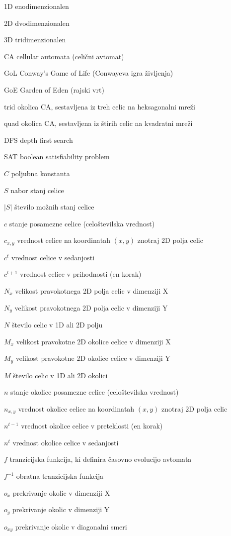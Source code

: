 \documentclass[12pt,a4paper,openany,twoside]{book}
\newcommand{\abbrlabel}[1]{\makebox[3cm][l]{\textbf{#1}\ \dotfill}}
\newenvironment{abbreviations}{\begin{list}{}{\renewcommand{\makelabel}{\abbrlabel}}}{\end{list}}
\begin{document}
\begin{abbreviations}
\item[1D] enodimenzionalen
\item[2D] dvodimenzionalen
\item[3D] tridimenzionalen
\item[CA] cellular automata (celični avtomat)
\item[GoL] Conway's Game of Life (Conwayeva igra življenja)
\item[GoE] Garden of Eden (rajski vrt)
\item[trid] okolica CA, sestavljena iz treh celic na heksagonalni mreži
\item[quad] okolica CA, sestavljena iz štirih celic na kvadratni mreži
\item[DFS] depth first search
\item[SAT] boolean satisfiability problem

\item[\(C\)] poljubna konstanta
\item[\(S\)] nabor stanj celice
\item[\(|S|\)] število možnih stanj celice
\item[\(c\)] stanje posamezne celice (celoštevilska vrednost)
\item[\(c_{x,y}\)] vrednost celice na koordinatah \((x,y)\) znotraj 2D polja celic
\item[\(c^t\)] vrednost celice v sedanjosti
\item[\(c^{t+1}\)] vrednost celice v prihodnosti (en korak)
\item[\(N_x\)] velikost pravokotnega 2D polja celic v dimenziji X
\item[\(N_y\)] velikost pravokotnega 2D polja celic v dimenziji Y
\item[\(N\)] število celic v 1D ali 2D polju
\item[\(M_x\)] velikost pravokotne 2D okolice celice v dimenziji X
\item[\(M_y\)] velikost pravokotne 2D okolice celice v dimenziji Y
\item[\(M\)] število celic v 1D ali 2D okolici
\item[\(n\)] stanje okolice posamezne celice (celoštevilska vrednost)
\item[\(n_{x,y}\)] vrednost okolice celice na koordinatah \((x,y)\) znotraj 2D polja celic
\item[\(n^{t-1}\)] vrednost okolice celice v preteklosti (en korak)
\item[\(n^t\)] vrednost okolice celice v sedanjosti
\item[\(f\)] tranzicijska funkcija, ki definira časovno evolucijo avtomata
\item[\(f^{-1}\)] obratna tranzicijska funkcija
\item[\(o_x\)] prekrivanje okolic v dimenziji X
\item[\(o_y\)] prekrivanje okolic v dimenziji Y
\item[\(o_{xy}\)] prekrivanje okolic v diagonalni smeri
\end{abbreviations}
\end{document}
